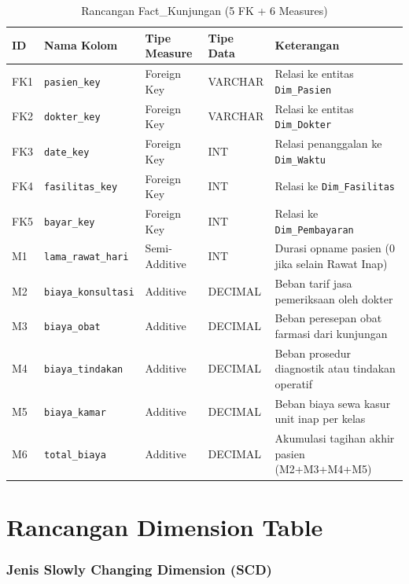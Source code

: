\begin{table}[H]
\centering
\caption{Rancangan Fact\_Kunjungan (5 FK + 6 Measures)}
\begin{tabularx}{\linewidth}{p{0.7cm}p{3.2cm}p{2.8cm}p{1.5cm}X}
\toprule
\textbf{ID} & \textbf{Nama Kolom} & \textbf{Tipe Measure} & \textbf{Tipe Data} & \textbf{Keterangan} \\
\midrule
FK1 & \texttt{pasien\_key}    & Foreign Key   & VARCHAR & Relasi ke entitas \texttt{Dim\_Pasien} \\
FK2 & \texttt{dokter\_key}    & Foreign Key   & VARCHAR & Relasi ke entitas \texttt{Dim\_Dokter} \\
FK3 & \texttt{date\_key}      & Foreign Key   & INT     & Relasi penanggalan ke \texttt{Dim\_Waktu} \\
FK4 & \texttt{fasilitas\_key} & Foreign Key   & INT     & Relasi ke \texttt{Dim\_Fasilitas} \\
FK5 & \texttt{bayar\_key}     & Foreign Key   & INT     & Relasi ke \texttt{Dim\_Pembayaran} \\
M1  & \texttt{lama\_rawat\_hari}   & Semi-Additive & INT     & Durasi opname pasien (0 jika selain Rawat Inap) \\
M2  & \texttt{biaya\_konsultasi}   & Additive      & DECIMAL & Beban tarif jasa pemeriksaan oleh dokter \\
M3  & \texttt{biaya\_obat}         & Additive      & DECIMAL & Beban peresepan obat farmasi dari kunjungan \\
M4  & \texttt{biaya\_tindakan}     & Additive      & DECIMAL & Beban prosedur diagnostik atau tindakan operatif \\
M5  & \texttt{biaya\_kamar}        & Additive      & DECIMAL & Beban biaya sewa kasur unit inap per kelas \\
M6  & \texttt{total\_biaya}        & Additive      & DECIMAL & Akumulasi tagihan akhir pasien (M2+M3+M4+M5) \\
\bottomrule
\end{tabularx}
\end{table}
 
\section{Rancangan Dimension Table}
 
\subsubsection{Jenis Slowly Changing Dimension (SCD)}
 
